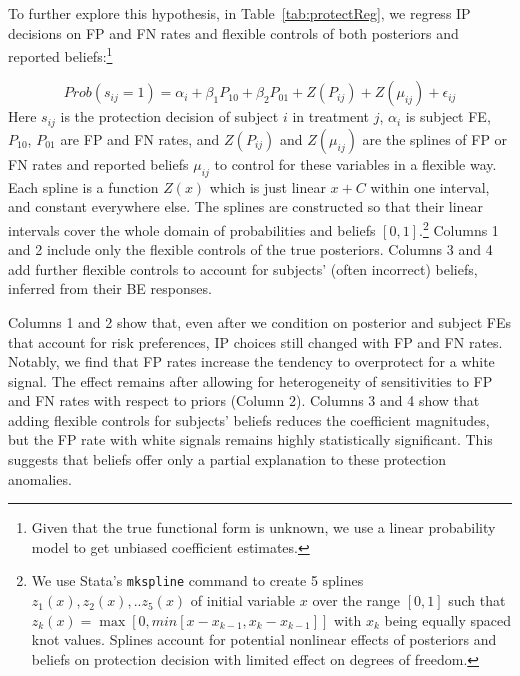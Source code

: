 \documentclass[12pt,a4paper]{article}
\begin{document}
To further explore this hypothesis, in Table~\ref{tab:protectReg}, we regress IP decisions on FP and FN rates and flexible controls of both posteriors and reported beliefs:\footnote{Given that the true functional form is unknown, we use a linear probability model to get unbiased coefficient estimates.}

	\[Prob(s_{ij}=1)=\alpha_i+\beta_1 P_{10}+\beta_2 P_{01} +Z(P_{ij})+Z(\mu_{ij})+\epsilon_{ij} \]
Here $s_{ij}$ is the protection decision of subject $i$ in treatment $j$, $\alpha_i$ is subject FE, $P_{10}$, $P_{01}$ are FP and FN rates, and $Z(P_{ij})$ and $Z(\mu_{ij})$ are the splines of FP or FN rates  and reported beliefs $\mu_{ij}$ to control for these variables in a flexible way. Each spline is a function $Z(x)$ which is just linear $x+C$ within one interval, and constant everywhere else. The splines are constructed so that their linear intervals cover the whole domain of probabilities and beliefs $[0,1]$.\footnote{We use Stata's \texttt{mkspline} command to create 5 splines $z_1(x),z_2(x),..z_5(x)$ of initial variable $x$ over the range $[0,1]$ such that $z_k(x)=\max[0,min[x-x_{k-1},x_k-x_{k-1}]]$ with $x_k$ being equally spaced knot values. Splines account for potential nonlinear effects of posteriors and beliefs on protection decision with limited effect on degrees of freedom.} Columns 1 and 2 include only the flexible controls of the true posteriors. Columns 3 and 4 add further flexible controls to account for subjects' (often incorrect) beliefs, inferred from their BE responses.

Columns 1 and 2 show that, even after we condition on posterior and subject FEs that account for risk preferences, IP choices still changed with FP and FN rates. Notably, we find that FP rates increase the tendency to overprotect for a white signal. The effect remains after allowing for heterogeneity of sensitivities to FP and FN rates with respect to priors (Column 2). Columns 3 and 4 show that adding flexible controls for subjects' beliefs reduces the coefficient magnitudes, but the FP rate with white signals remains highly statistically significant. This suggests that beliefs offer only a partial explanation to these protection anomalies.
\end{document}
